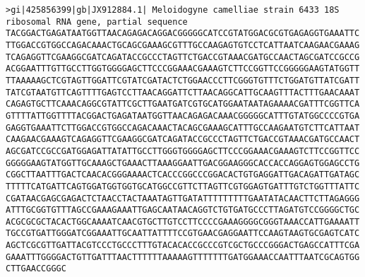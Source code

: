 \documentclass[11pt]{article}
\begin{document}
\begin{Verbatim}[commandchars=\\\{\}]
>gi|425856399|gb|JX912884.1| Meloidogyne camelliae strain 6433 18S ribosomal RNA gene, partial sequence
TACGGACTGAGATAATGGTTAACAGAGACAGGACGGGGGCATCCGTATGGACGCGTGAGAGGTGAAATTC
TTGGACCGTGGCCAGACAAACTGCAGCGAAAGCGTTTGCCAAGAGTGTCCTCATTAATCAAGAACGAAAG
TCAGAGGTTCGAAGGCGATCAGATACCGCCCTAGTTCTGACCGTAAACGATGCCAACTAGCGATCCGCCG
ACGGAATTTGTTGCCTTGGTGGGGAGCTTCCCGGAAACGAAAGTCTTCCGGTTCCGGGGGAAGTATGGTT
TTAAAAAGCTCGTAGTTGGATTCGTATCGATACTCTGGAACCCTTCGGGTGTTTCTGGATGTTATCGATT
TATCGTAATGTTCAGTTTTGAGTCCTTAACAGGATTCTTAACAGGCATTGCAAGTTTACTTTGAACAAAT
CAGAGTGCTTCAAACAGGCGTATTCGCTTGAATGATCGTGCATGGAATAATAGAAAACGATTTCGGTTCA
GTTTTATTGGTTTTACGGACTGAGATAATGGTTAACAGAGACAAACGGGGGCATTTGTATGGCCCCGTGA
GAGGTGAAATTCTTGGACCGTGGCCAGACAAACTACAGCGAAAGCATTTGCCAAGAATGTCTTCATTAAT
CAAGAACGAAAGTCAGAGGTTCGAAGGCGATCAGATACCGCCCTAGTTCTGACCGTAAACGATGCCAACT
AGCGATCCGCCGATGGAGATTATATTGCCTTGGGTGGGGAGCTTCCCGGAAACGAAAGTCTTCCGGTTCC
GGGGGAAGTATGGTTGCAAAGCTGAAACTTAAAGGAATTGACGGAAGGGCACCACCAGGAGTGGAGCCTG
CGGCTTAATTTGACTCAACACGGGAAAACTCACCCGGCCCGGACACTGTGAGGATTGACAGATTGATAGC
TTTTTCATGATTCAGTGGATGGTGGTGCATGGCCGTTCTTAGTTCGTGGAGTGATTTGTCTGGTTTATTC
CGATAACGAGCGAGACTCTAACCTACTAAATAGTTGATATTTTTTTTTGAATATACAACTTCTTAGAGGG
ATTTGCGGTGTTTAGCCGAAAGAAATTGAGCAATAACAGGTCTGTGATGCCCTTAGATGTCCGGGGCTGC
ACGCGCGCTACACTGGCAAAATCAACGTGCTTGTCCTTCCCCGAAAGGGGCGGGTAAACCATTGAAAATT
TGCCGTGATTGGGATCGGAAATTGCAATTATTTTCCGTGAACGAGGAATTCCAAGTAAGTGCGAGTCATC
AGCTCGCGTTGATTACGTCCCTGCCCTTTGTACACACCGCCCGTCGCTGCCCGGGACTGAGCCATTTCGA
GAAATTTGGGGACTGTTGATTTAACTTTTTTAAAAAGTTTTTTTGATGGAAACCAATTTAATCGCAGTGG
CTTGAACCGGGC


\end{Verbatim}
\end{document}

